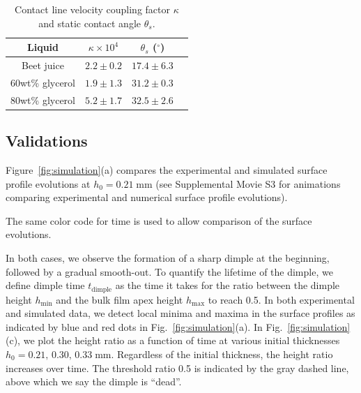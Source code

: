 \documentclass[aps,prfluids,amsmath,amssymb,superscriptaddress,longbibliography]{revtex4-2}
\newif\ifhighlight
\newcommand{\hl}[1]{\ifhighlight\textcolor{blue}{#1}\else#1\fi}
\begin{document}
\begin{table}[ht]
    \centering
    \begin{tabular}{cccc}
    \hline
    Liquid          & $\kappa\times 10^{4}$ & $\theta_s$ ($^\circ$) \\
    \hline
    Beet juice      & $2.2\pm 0.2$            & $17.4\pm 6.3$           \\
    60wt\% glycerol & $1.9\pm 1.3$            & $31.2\pm 0.3$          \\
    80wt\% glycerol & $5.2\pm 1.7$            & $32.5\pm 2.6$           \\
    \hline
    \end{tabular}
    \caption{
    Contact line velocity coupling factor $\kappa$ and static contact angle $\theta_s$.
    }
    \label{tab:contact-line-dynamics}
\end{table}


\subsection{Validations}

Figure~\ref{fig:simulation}(a) compares the experimental and simulated surface profile evolutions at $h_0=0.21\;\mathrm{mm}$ (see Supplemental Movie S3 for animations comparing experimental and numerical surface profile evolutions).
\hl{
The same color code for time is used to allow comparison of the surface evolutions.
}
In both cases, we observe the formation of a sharp dimple at the beginning, followed by a gradual smooth-out. 
To quantify the lifetime of the dimple, we define dimple time $t_{\mathrm{dimple}}$ as the time it takes for the ratio between the dimple height $h_\mathrm{min}$ and the bulk film apex height $h_\mathrm{max}$ to reach 0.5. 
In both experimental and simulated data, we detect local minima and maxima in the surface profiles as indicated by blue and red dots in Fig.~\ref{fig:simulation}(a).
In Fig.~\ref{fig:simulation}(c), we plot the height ratio as a function of time at various initial thicknesses $h_0=0.21,\,0.30,\,0.33\;\mathrm{mm}$.
Regardless of the initial thickness, the height ratio increases over time.
The threshold ratio 0.5 is indicated by the gray dashed line, above which we say the dimple is ``dead''.
\end{document}
